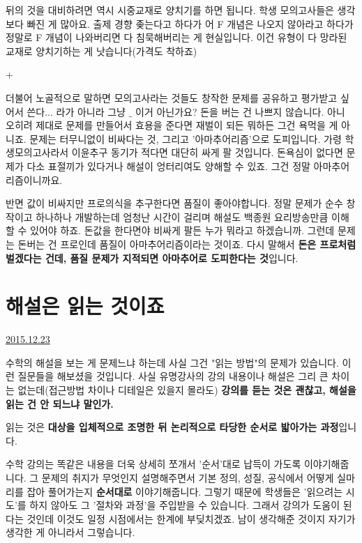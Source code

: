 뒤의 것을 대비하려면 역시 시중교재로 양치기를 하면 됩니다.
학생 모의고사들은 생각보다 빠진 게 많아요. 출제 경향 좆는다고 하다가 어 F 개념은 나오지 않아라고 하다가
정말로 F 개념이 나와버리면 다 침묵해버리는 게 현실입니다. 이건 유형이 다 망라된 교재로 양치기하는 게 낫습니다(가격도 착하죠)
\vspace{5mm}

+
\vspace{5mm}

더불어 노골적으로 말하면 모의고사라는 것들도
창작한 문제를 공유하고 평가받고 싶어서 쓴다... 라가 아니라 그냥 $\_$ 이거 아닌가요?
돈을 버는 건 나쁘지 않습니다. 아니 오히려 제대로 문제를 만들어서 효용을 준다면 재벌이 되든 뭐하든 그건 욕먹을 게 아니죠.
문제는 터무니없이 비싸다는 것, 그리고 '아마추어리즘'으로 도피입니다.
가령 학생모의고사라서 이윤추구 동기가 적다면 대단히 싸게 팔 것입니다.
돈욕심이 없다면 문제가 다소 표절끼가 있다거나 해설이 엉터리여도 양해할 수 있죠.
그건 정말 아마추어리즘이니까요.
\vspace{5mm}

반면 값이 비싸지만 프로의식을 추구한다면 품질이 좋아야합니다.
정말 문제가 순수 창작이고 하나하나 개발하는데 엄청난 시간이 걸리며 해설도 백종원 요리방송만큼 이해할 수 있어야 하죠.
돈값을 한다면야 비싸게 팔든 누가 뭐라고 하겠습니까.
그런데 문제는 돈버는 건 프로인데 품질이 아마추어리즘이라는 것이죠.
다시 말해서 \textbf{돈은 프로처럼 벌겠다는 건데, 품질 문제가 지적되면 아마추어로 도피한다는 것}입니다.
\vspace{5mm}






\section{해설은 읽는 것이죠}
\href{https://www.kockoc.com/Apoc/559722}{2015.12.23}

\vspace{5mm}

수학의 해설을 보는 게 문제느냐 하는데 사실 그건 "읽는 방법"의 문제가 있습니다.
이런 질문들을 해보셨을 것입니다.
사실 유명강사의 강의 내용이나 해설은 그리 큰 차이는 없는데(접근방법 차이나 디테일은 있을지 몰라도)
\textbf{강의를 듣는 것은 괜찮고, 해설을 읽는 건 안 되느냐 말인가.}
\vspace{5mm}

읽는 것은 \textbf{대상을 입체적으로 조명한 뒤 논리적으로 타당한 순서로 밟아가는 과정}입니다.
\vspace{5mm}

수학 강의는 똑같은 내용을 더욱 상세히 쪼개서 '순서'대로 납득이 가도록 이야기해줍니다.
그 문제의 취지가 무엇인지 설명해주면서 기본 정의, 성질, 공식에서 어떻게 실마리를 잡아 풀어가는지 \textbf{순서대로} 이야기해줍니다.
그렇기 때문에 학생들은 '읽으려는 시도'를 하지 않아도 그 '절차와 과정'을 주입받을 수 있습니다.
그래서 강의가 도움이 된다는 것인데 이것도 일정 시점에서는 한계에 부딪치겠죠. 남이 생각해준 것이지 자기가 생각한 게 아니라서 그렇습니다.
\vspace{5mm}


